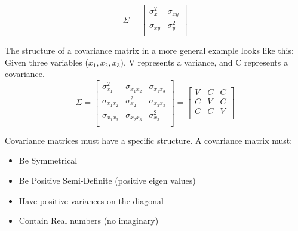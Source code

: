 \[
\Sigma =
\begin{bmatrix}
\sigma_{x}^2 & \sigma_{xy} \\
\sigma_{xy} & \sigma_{y}^2 \\
\end{bmatrix}
\]

The structure of a covariance matrix in a more general example looks like this:
Given three variables ($x_1,x_2,x_3$), V represents a variance, and C represents a covariance.
\[
\Sigma = 
\begin{bmatrix}
\sigma_{x_1}^2 & \sigma_{x_1x_2} & \sigma_{x_1x_3} \\
\sigma_{x_1x_2} & \sigma_{x_2}^2 & \sigma_{x_2x_3} \\
\sigma_{x_1x_3} & \sigma_{x_2x_3} & \sigma_{x_3}^2 \\
\end{bmatrix}
=
\begin{bmatrix}
V & C & C \\
C & V & C \\
C & C & V \\
\end{bmatrix}
\]

Covariance matrices must have a specific structure.  A covariance matrix must:
\begin{itemize}
	\item Be Symmetrical
	\item Be Positive Semi-Definite (positive eigen values)
	\item Have positive variances on the diagonal
	\item Contain Real numbers (no imaginary)
\end{itemize}